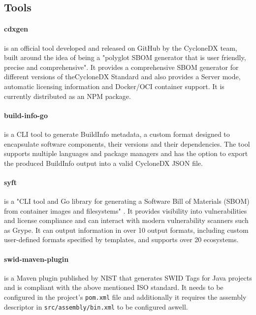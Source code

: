\subsection{Tools} \label{methodology:tools}

\paragraph{cdxgen} is an official tool developed and released on GitHub by the CycloneDX team, built around the idea of being a "polyglot SBOM generator that is user friendly, precise and comprehensive". It provides a comprehensive SBOM generator for different versions of theCycloneDX Standard and also provides a Server mode, automatic licensing information and Docker/OCI container support. It is currently distributed as an NPM package.

\paragraph{build-info-go} is a CLI tool to generate BuildInfo metadata, a custom format designed to encapsulate software components, their versions and their dependencies. The tool supports multiple languages and package managers and has the option to export the produced BuildInfo output into a valid CycloneDX JSON file.

\paragraph{syft} is a "CLI tool and Go library for generating a Software Bill of Materials (SBOM) from container images and filesystems" \cite{repository:cyclonedx:syft}. It provides visibility into vulnerabilities and license compliance and can interact with modern vulnerability scanners such as Grype. It can output information in over 10 output formats, including custom user-defined formats specified by templates, and supports over 20 ecosystems.


\paragraph{swid-maven-plugin} is a Maven plugin published by NIST \cite{repository:swid-maven-plugin} that generates SWID Tags for Java projects and is compliant with the above mentioned ISO standard. It needs to be configured in the project's \verb|pom.xml| file and additionally it requires the assembly descriptor in \verb|src/assembly/bin.xml| to be configured aswell.

